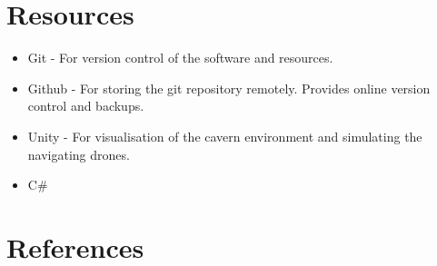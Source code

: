\documentclass{article}
\begin{document}
\section{Resources}

\begin{itemize}
    \item Git - For version control of the software and resources.
    \item Github - For storing the git repository remotely. Provides online version control and backups.
    \item Unity - For visualisation of the cavern environment and simulating the navigating drones.
    \item C\#
\end{itemize}

\section{References}
\end{document}
